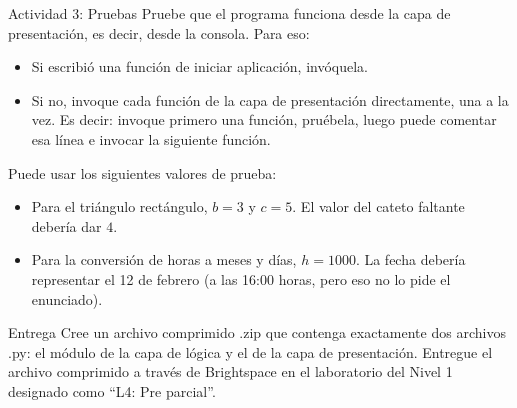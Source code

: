 \documentclass{ip-lab}
\begin{document}
\pagebreak

\begin{sectionbox}{Actividad 3: Pruebas}
Pruebe que el programa funciona desde la capa de presentación, es decir, desde la consola. Para eso:
\begin{itemize}
    \item Si escribió una función de iniciar aplicación, invóquela.
    \item Si no, invoque cada función de la capa de presentación directamente, una a la vez. Es decir: invoque primero una función, pruébela, luego puede comentar esa línea e invocar la siguiente función.
\end{itemize}

Puede usar los siguientes valores de prueba:
\begin{itemize}
  \item Para el triángulo rectángulo, $b = 3$ y $c = 5$. El valor del cateto faltante debería dar $4$.
  \item Para la conversión de horas a meses y días, $h = 1000$. La fecha debería representar el 12 de febrero (a las 16:00 horas, pero eso no lo pide el enunciado).
\end{itemize}

\end{sectionbox}

\begin{sectionbox}{Entrega}
  Cree un archivo comprimido .zip que contenga exactamente dos archivos .py: el módulo de la capa de lógica y el de la capa de presentación. Entregue el archivo comprimido a través de Brightspace en el laboratorio del Nivel 1 designado como ``L4: Pre parcial''.
\end{sectionbox}
\end{document}
